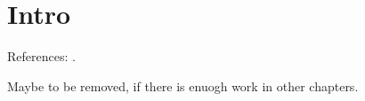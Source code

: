 \section{Intro}

References: \cite{crystal2,crystal3,crystal2012}.

Maybe to be removed, if there is enuogh work in other chapters.
